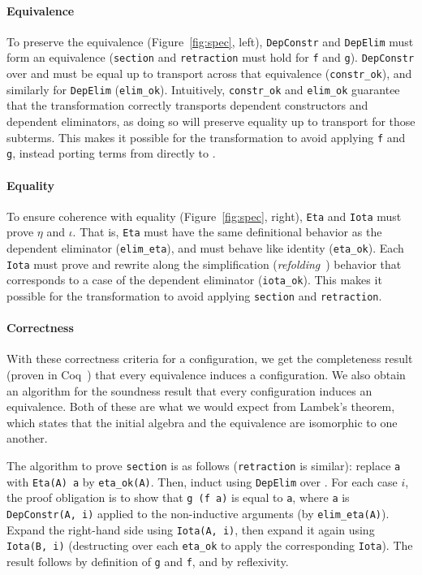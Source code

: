 \paragraph{Equivalence}
To preserve the equivalence (Figure~\ref{fig:spec}, left), \lstinline{DepConstr} and \lstinline{DepElim} must form an equivalence
(\lstinline{section} and \lstinline{retraction} must hold for \lstinline{f} and \lstinline{g}).
\lstinline{DepConstr} over \Aa and \B must be equal up to transport across that equivalence (\lstinline{constr_ok}), 
and similarly for \lstinline{DepElim} (\lstinline{elim_ok}).
Intuitively, \lstinline{constr_ok} and \lstinline{elim_ok} guarantee that the transformation
correctly transports dependent constructors and dependent eliminators,
as doing so will preserve equality up to transport for those subterms.
This makes it possible for the transformation
to avoid applying \lstinline{f} and \lstinline{g}, instead porting terms from \Aa directly to \B.

\paragraph{Equality}
To ensure coherence with equality (Figure~\ref{fig:spec}, right),
\lstinline{Eta} and \lstinline{Iota} must prove $\eta$ and $\iota$.
That is, \lstinline{Eta} must have the same definitional behavior as the dependent eliminator (\lstinline{elim_eta}),
and must behave like identity (\lstinline{eta_ok}).
Each \lstinline{Iota} must prove and rewrite along the simplification (\textit{refolding}~\cite{boutillier:tel-01054723}) behavior that corresponds to a case of the dependent eliminator (\lstinline{iota_ok}).
This makes it possible for the transformation to
avoid applying \lstinline{section} and \lstinline{retraction}.

\paragraph{Correctness}
With these correctness criteria for a configuration, we get the completeness result (proven in Coq~\href{https://github.com/uwplse/pumpkin-pi/blob/v2.0.0/plugin/coq/playground/arbitrary.v}{}) that every equivalence induces a configuration. %
We also obtain an algorithm for the soundness result that every configuration induces an equivalence.
Both of these are what we would expect from Lambek's theorem, which states that the initial algebra and the equivalence are isomorphic to one another.

The algorithm to prove \lstinline{section} is as follows (\lstinline{retraction} is similar):
replace \lstinline{a} with \lstinline{Eta(A) a} by \lstinline{eta_ok(A)}.
Then, induct using \lstinline{DepElim} over \Aa.
For each case $i$, the proof obligation is to show that \lstinline{g (f a)} is equal to \lstinline{a},
where \lstinline{a} is \lstinline{DepConstr(A, i)} applied to the non-inductive arguments (by \lstinline{elim_eta(A)}).
Expand the right-hand side using \lstinline{Iota(A, i)}, then expand it again using \lstinline{Iota(B, i)}
(destructing over each \lstinline{eta_ok} to apply the corresponding \lstinline{Iota}).
The result follows by definition of \lstinline{g} and \lstinline{f}, and by reflexivity.

